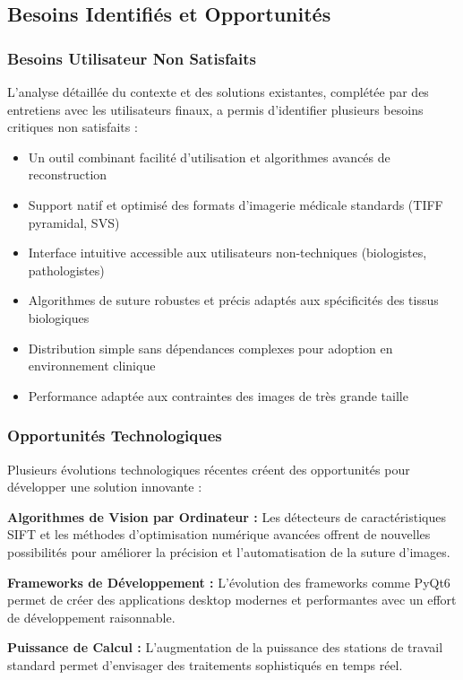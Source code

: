 \documentclass[12pt,a4paper]{article}
\begin{document}
\subsection{Besoins Identifiés et Opportunités}

\subsubsection{Besoins Utilisateur Non Satisfaits}

L'analyse détaillée du contexte et des solutions existantes, complétée par des entretiens avec les utilisateurs finaux, a permis d'identifier plusieurs besoins critiques non satisfaits :

\begin{itemize}
\item Un outil combinant facilité d'utilisation et algorithmes avancés de reconstruction
\item Support natif et optimisé des formats d'imagerie médicale standards (TIFF pyramidal, SVS)
\item Interface intuitive accessible aux utilisateurs non-techniques (biologistes, pathologistes)
\item Algorithmes de suture robustes et précis adaptés aux spécificités des tissus biologiques
\item Distribution simple sans dépendances complexes pour adoption en environnement clinique
\item Performance adaptée aux contraintes des images de très grande taille
\end{itemize}

\subsubsection{Opportunités Technologiques}

Plusieurs évolutions technologiques récentes créent des opportunités pour développer une solution innovante :

\textbf{Algorithmes de Vision par Ordinateur :} Les détecteurs de caractéristiques SIFT et les méthodes d'optimisation numérique avancées offrent de nouvelles possibilités pour améliorer la précision et l'automatisation de la suture d'images.

\textbf{Frameworks de Développement :} L'évolution des frameworks comme PyQt6 permet de créer des applications desktop modernes et performantes avec un effort de développement raisonnable.

\textbf{Puissance de Calcul :} L'augmentation de la puissance des stations de travail standard permet d'envisager des traitements sophistiqués en temps réel.
\end{document}
